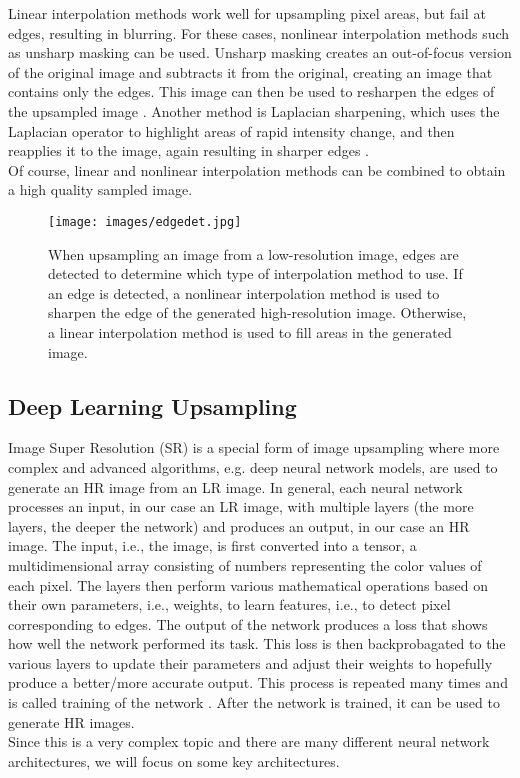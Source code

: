 \documentclass[letterpaper, 10 pt, conference]{ieeeconf}  %
\begin{document}
Linear interpolation methods work well for upsampling pixel areas, but fail at edges, resulting in blurring.
For these cases, nonlinear interpolation methods such as unsharp masking can be used. Unsharp masking creates an out-of-focus version of the original image and subtracts it from the original, creating an image that contains only the edges.
This image can then be used to resharpen the edges of the upsampled image \cite{deng2010generalized}.
Another method is Laplacian sharpening, which uses the Laplacian operator to highlight areas of rapid intensity change, and then reapplies it to the image, again resulting in sharper edges \cite{wang2022interpolation}.\\

Of course, linear and nonlinear interpolation methods can be combined to obtain a high quality sampled image.

\begin{figure}[!ht]
        \caption{When upsampling an image from a low-resolution image, edges are detected to determine which type of interpolation method to use.
                If an edge is detected, a nonlinear interpolation method is used to sharpen the edge of the generated high-resolution image. 
                Otherwise, a linear interpolation method is used to fill areas in the generated image.}
        \centering
        \texttt{[image: images/edgedet.jpg]}
        \label{fig:edge_det}
    \end{figure}

\subsection{Deep Learning Upsampling}

Image Super Resolution (SR) is a special form of image upsampling where more complex and advanced algorithms, e.g. deep neural network models, are used to generate an HR image from an LR image. 
In general, each neural network processes an input, in our case an LR image, with multiple layers (the more layers, the deeper the network) and produces an output, in our case an HR image.
The input, i.e., the image, is first converted into a tensor, a multidimensional array consisting of numbers representing the color values of each pixel. 
The layers then perform various mathematical operations based on their own parameters, i.e., weights, to learn features, i.e., to detect pixel corresponding to edges.
The output of the network produces a loss that shows how well the network performed its task. 
This loss is then backprobagated to the various layers to update their parameters and adjust their weights to hopefully produce a better/more accurate output.
This process is repeated many times and is called training of the network \cite{goodfellow2016deep}.
After the network is trained, it can be used to generate HR images.\\
Since this is a very complex topic and there are many different neural network architectures, we will focus on some key architectures.
\end{document}
